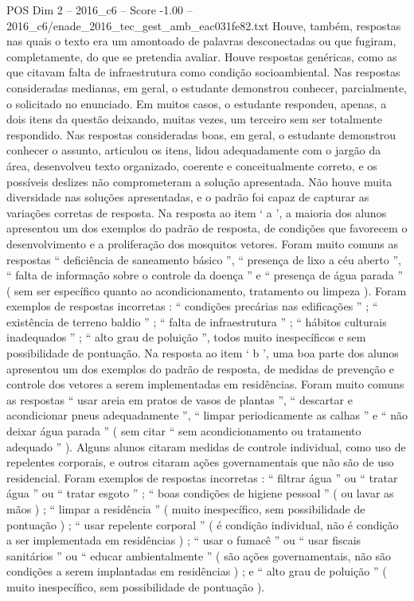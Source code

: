 \begin{textsample}{POS Dim 2 – 2016\_c6 – Score -1.00 – 2016\_c6/enade\_2016\_tec\_gest\_amb\_eac031fe82.txt}
Houve, também, respostas nas quais o texto era um amontoado de palavras desconectadas ou que fugiram, completamente, do que se pretendia avaliar.
Houve respostas genéricas, como as que citavam falta de infraestrutura como condição socioambiental.
Nas respostas consideradas medianas, em geral, o estudante demonstrou conhecer, parcialmente, o solicitado no enunciado.
Em muitos casos, o estudante respondeu, apenas, a dois itens da questão deixando, muitas vezes, um terceiro sem ser totalmente respondido.
Nas respostas consideradas boas, em geral, o estudante demonstrou conhecer o assunto, articulou os itens, lidou adequadamente com o jargão da área, desenvolveu texto organizado, coerente e conceitualmente correto, e os possíveis deslizes não comprometeram a solução apresentada.
Não houve muita diversidade nas soluções apresentadas, e o padrão foi capaz de capturar as variações corretas de resposta.
Na resposta ao item ‘ a ’, a maioria dos alunos apresentou um dos exemplos do padrão de resposta, de condições que favorecem o desenvolvimento e a proliferação dos mosquitos vetores.
Foram muito comuns as respostas “ deficiência de saneamento básico ”, “ presença de lixo a céu aberto ”, “ falta de informação sobre o controle da doença ” e “ presença de água parada ” ( sem ser específico quanto ao acondicionamento, tratamento ou limpeza ).
Foram exemplos de respostas incorretas : “ condições precárias nas edificações ” ; “ existência de terreno baldio ” ; “ falta de infraestrutura ” ; “ hábitos culturais inadequados ” ; “ alto grau de poluição ”, todos muito inespecíficos e sem possibilidade de pontuação.
Na resposta ao item ‘ b ’, uma boa parte dos alunos apresentou um dos exemplos do padrão de resposta, de medidas de prevenção e controle dos vetores a serem implementadas em residências.
Foram muito comuns as respostas “ usar areia em pratos de vasos de plantas ”, “ descartar e acondicionar pneus adequadamente ”, “ limpar periodicamente as calhas ” e “ não deixar água parada ” ( sem citar “ sem acondicionamento ou tratamento adequado ” ).
Alguns alunos citaram medidas de controle individual, como uso de repelentes corporais, e outros citaram ações governamentais que não são de uso residencial.
Foram exemplos de respostas incorretas : “ filtrar água ” ou “ tratar água ” ou “ tratar esgoto ” ; “ boas condições de higiene pessoal ” ( ou lavar as mãos ) ; “ limpar a residência ” ( muito inespecífico, sem possibilidade de pontuação ) ; “ usar repelente corporal ” ( é condição individual, não é condição a ser implementada em residências ) ; “ usar o fumacê ” ou “ usar fiscais sanitários ” ou “ educar ambientalmente ” ( são ações governamentais, não são condições a serem implantadas em residências ) ; e “ alto grau de poluição ” ( muito inespecífico, sem possibilidade de pontuação ).

\end{textsample}
